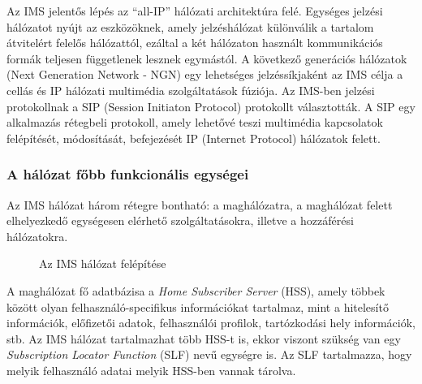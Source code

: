 Az IMS jelentős lépés az ``all-IP'' hálózati architektúra felé. Egységes jelzési hálózatot nyújt az eszközöknek, amely jel\-zés\-há\-ló\-zat különválik a tartalom átvitelért felelős hálózattól, ezáltal a két hálózaton használt kommunikációs formák teljesen függetlenek lesznek egymástól. A következő generációs hálózatok (Next Generation Network - NGN) egy lehetséges jelzéssíkjaként az IMS célja a cellás és IP hálózati multimédia szolgáltatások fúziója. Az IMS-ben jelzési protokollnak a  SIP (Session Initiaton Protocol) protokollt választották. A SIP egy alkalmazás rétegbeli protokoll, amely lehetővé teszi multimédia kapcsolatok felépítését, módosítását, befejezését IP (Internet Protocol) hálózatok felett. 

\subsubsection{A hálózat főbb funkcionális egységei}

Az IMS hálózat három rétegre bontható: a maghálózatra, a maghálózat felett elhelyezkedő egységesen elérhető szolgáltatásokra, illetve a hozzáférési hálózatokra.

\begin{figure}[htbp]
\center
{}
\caption{Az IMS hálózat felépítése}
\label{fig:model}
\end{figure}


A maghálózat fő adatbázisa a \emph{Home Subscriber Server} (HSS), amely többek között olyan felhasználó-specifikus információkat tartalmaz, mint a hitelesítő információk, előfizetői adatok, felhasználói profilok, tartózkodási hely információk, stb. Az IMS hálózat tartalmazhat több HSS-t is, ekkor viszont szükség van egy \emph{Subscription Locator Function} (SLF) nevű egységre is. Az SLF tartalmazza, hogy melyik felhasználó adatai melyik HSS-ben vannak tárolva.

